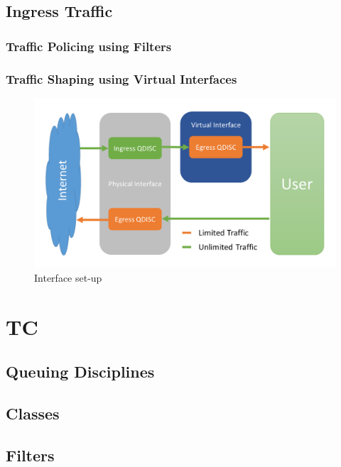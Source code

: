 \vfill
\subsection{Ingress Traffic} \label{Ingress Traffic}
\subsubsection{Traffic Policing using Filters}
\subsubsection{Traffic Shaping using Virtual Interfaces}

\begin{figure}[h]
	\centering
	\includegraphics[width=\textwidth]{img/Interface-Setup.png}
	\caption{Interface set-up}
	\label{Interface set-up}
\end{figure}
\section{TC} \label{TC}
\subsection{Queuing Disciplines}
\subsection{Classes}
\subsection{Filters}